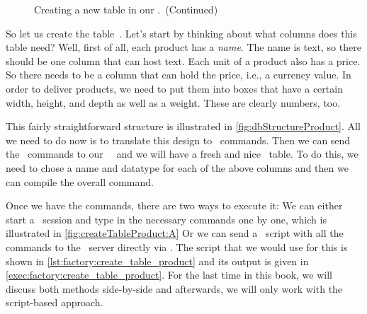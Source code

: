 \begin{figure}%
\ContinuedFloat%
\centering%
%
%
%
\FloatBarrier%
%
%
%
\FloatBarrier%
%
%
%
\FloatBarrier%
%
%
%
\caption{Creating a new table in our \db.~(Continued)}%
\label{fig:createTableProduct:B}%
\end{figure}%
%
%
%
%
So let us create the table~.
Let's start by thinking about what columns does this table need?
Well, first of all, each product has a \emph{name}.
The name is text, so there should be one column that can host text.
Each unit of a product also has a price.
So there needs to be a column that can hold the price, i.e., a currency value.
In order to deliver products, we need to put them into boxes that have a certain width, height, and depth as well as a weight.
These are clearly numbers, too.

This fairly straightforward structure is illustrated in \cref{fig:dbStructureProduct}.
All we need to do now is to translate this design to \sql\ commands.
Then we can send the \sql\ commands to our \postgresql\ \dbms\ and we will have a fresh and nice ~table.
To do this, we need to chose a name and datatype for each of the above columns and then we can compile the overall command.

Once we have the commands, there are two ways to execute it:
We can either start a \psql\ session and type in the necessary commands one by one, which is illustrated in \cref{fig:createTableProduct:A}%
Or we can send a \sql\ script with all the commands to the \postgresql\ server directly via \psql.
The script that we would use for this is shown in \cref{lst:factory:create_table_product} and its output is given in \cref{exec:factory:create_table_product}.
For the last time in this book, we will discuss both methods side-by-side and afterwards, we will only work with the script-based approach.


